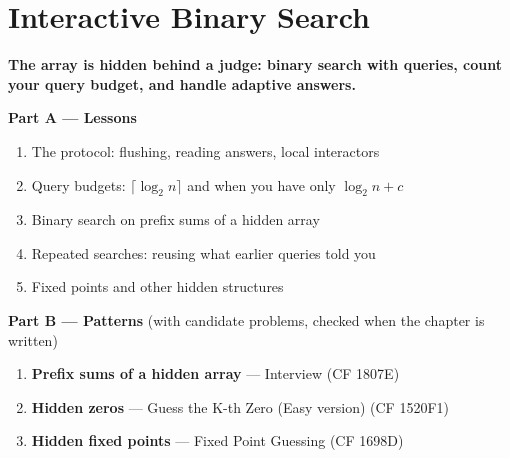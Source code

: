 \chapter{Interactive Binary Search}
\label{ch:interactive}

\begin{tcolorbox}[enhanced, colback=white, colframe=secondaryblue, boxrule=1pt, arc=2mm]
\textbf{\large\textcolor{primaryblue}{The array is hidden behind a judge: binary search with queries, count your query budget, and handle adaptive answers.}}
\end{tcolorbox}


\begin{plannedbox}
\textbf{Part A --- Lessons}
\begin{enumerate}[leftmargin=*, label=\textbf{A\arabic*.}, itemsep=1pt]
    \item The protocol: flushing, reading answers, local interactors
    \item Query budgets: $\lceil \log_2 n \rceil$ and when you have only $\log_2 n + c$
    \item Binary search on prefix sums of a hidden array
    \item Repeated searches: reusing what earlier queries told you
    \item Fixed points and other hidden structures
\end{enumerate}
\textbf{Part B --- Patterns} (with candidate problems, checked when the chapter is written)
\begin{enumerate}[leftmargin=*, label=\textbf{P\arabic*.}, itemsep=1pt]
    \item \textbf{Prefix sums of a hidden array} --- Interview {\small\color{darkgray}(CF 1807E)}
    \item \textbf{Hidden zeros} --- Guess the K-th Zero (Easy version) {\small\color{darkgray}(CF 1520F1)}
    \item \textbf{Hidden fixed points} --- Fixed Point Guessing {\small\color{darkgray}(CF 1698D)}
\end{enumerate}
\end{plannedbox}
